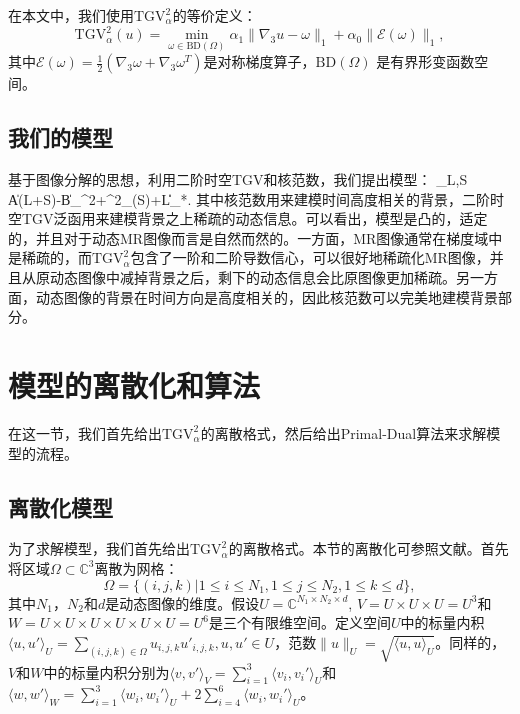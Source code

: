 在本文中，我们使用$\mathrm{TGV}_{\alpha}^2$的等价定义：
$$\mathrm{TGV}_\alpha^2(u)=\min_{\omega\in \mathrm{BD}(\Omega)}\alpha_1\|\nabla_3 u-\omega\|_1 + \alpha_0\|\mathcal{E}(\omega)\|_1,$$
其中$\mathcal{E}(\omega)=\frac{1}{2}(\nabla_3\omega+\nabla_3\omega^{T})$是对称梯度算子，$\mathrm{BD}(\Omega)$ 是有界形变函数空间。

\subsection{我们的模型}
基于图像分解的思想，利用二阶时空TGV和核范数，我们提出模型：
\beq
\min_{L,S} \|A(L+S)-B\|_{}^2+^2_\alpha(S)+\beta\|L\|_*.
\label{equ:proposed}
\eeq
其中核范数用来建模时间高度相关的背景，二阶时空TGV泛函用来建模背景之上稀疏的动态信息。可以看出，模型是凸的，适定的，并且对于动态MR图像而言是自然而然的。一方面，MR图像通常在梯度域中是稀疏的，而$\mathrm{TGV}_{\alpha}^2$包含了一阶和二阶导数信心，可以很好地稀疏化MR图像，并且从原动态图像中减掉背景之后，剩下的动态信息会比原图像更加稀疏。另一方面，动态图像的背景在时间方向是高度相关的，因此核范数可以完美地建模背景部分。

\section{模型的离散化和算法}
在这一节，我们首先给出$\mathrm{TGV}_{\alpha}^2$的离散格式，然后给出Primal-Dual算法来求解模型的流程。

\subsection{离散化模型}
为了求解模型，我们首先给出$\mathrm{TGV}_{\alpha}^2$的离散格式。本节的离散化可参照文献\cite{tgv,pd}。首先将区域$\Omega\subset\mathbb{C}^3$离散为网格：
$$\Omega=\{(i,j,k)\big|1\leq i\leq N_1, 1\leq j\leq N_2, 1\leq k\leq d\},$$
其中$N_1$，$N_2$和$d$是动态图像的维度。假设$U=\mathbb{C}^{N_1\times N_2\times d}$, $V=U\times U\times U=U^3$和$W=U\times U\times U\times U\times U\times U=U^6$是三个有限维空间。定义空间$U$中的标量内积$\langle u,u' \rangle _U=\sum_{(i,j,k)\in \Omega}u_{i,j,k}u'_{i,j,k}, u,u'\in U$，范数$\|u\|_U=\sqrt{\langle u,u \rangle _U}$。同样的，$V$和$W$中的标量内积分别为$\langle v,v'\rangle_V=\sum_{i=1}^3\langle v_i,v_i'\rangle_U$和$\langle w,w'\rangle_W=\sum_{i=1}^3\langle w_i,w_i'\rangle_U + 2\sum_{i=4}^6\langle w_i,w_i'\rangle_U$。

